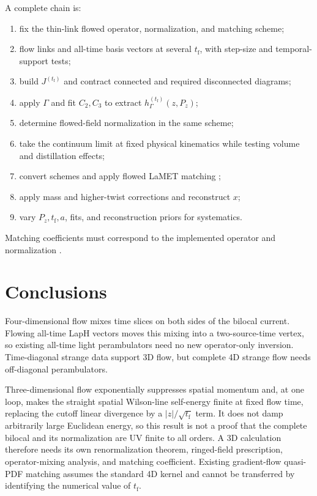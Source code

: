 \documentclass[11pt]{article}
\numberwithin{equation}{section}
\newcommand{\tf}{t_{\mathrm f}}
\newcommand{\hflow}{h_{\Gamma}^{(\tf)}}
\begin{document}
A complete chain is:
\begin{enumerate}
  \item fix the thin-link flowed operator, normalization, and matching scheme;
  \item flow links and all-time basis vectors at several \(\tf\), with
        step-size and temporal-support tests;
  \item build \(J^{(\tf)}\) and contract connected and required disconnected
        diagrams;
  \item apply \(\Gamma\) and fit \(C_2,C_3\) to extract \(\hflow(z,P_z)\);
  \item determine flowed-field normalization in the same scheme;
  \item take the continuum limit at fixed physical kinematics while testing
        volume and distillation effects;
  \item convert schemes and apply flowed LaMET matching
        \cite{MonahanOrginos2017,Monahan2018};
  \item apply mass and higher-twist corrections and reconstruct \(x\);
  \item vary \(P_z,\tf,a\), fits, and reconstruction priors for systematics.
\end{enumerate}
Matching coefficients must correspond to the implemented operator and
normalization \cite{Xiong2014,Izubuchi2018,Constantinou2021}.

\section{Conclusions}

Four-dimensional flow mixes time slices on both sides of the bilocal current.
Flowing all-time LapH vectors moves this mixing into a two-source-time vertex,
so existing all-time light perambulators need no new operator-only inversion.
Time-diagonal strange data support 3D flow, but complete 4D strange flow needs
off-diagonal perambulators.

Three-dimensional flow exponentially suppresses spatial momentum and, at one
loop, makes the straight spatial Wilson-line self-energy finite at fixed flow
time, replacing the cutoff linear divergence by a
\(|z|/\sqrt{\tf}\) term.  It does not damp arbitrarily large Euclidean energy,
so this result is not a proof that the complete bilocal and its normalization
are UV finite to all orders.  A 3D calculation therefore needs its own
renormalization theorem, ringed-field prescription, operator-mixing analysis,
and matching coefficient.  Existing gradient-flow quasi-PDF matching assumes
the standard 4D kernel and cannot be transferred by identifying the numerical
value of \(\tf\).
\end{document}
